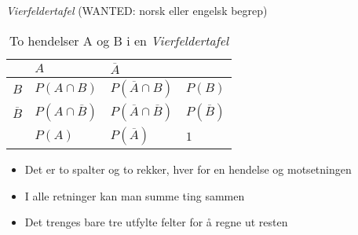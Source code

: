\begin{frame}{\textit{Vierfeldertafel} (WANTED: norsk eller engelsk begrep)}
\begin{table}[h!]
\centering
\label{tab:prob_two_events}
\begin{tabular}{l|ll|l}
\cline{2-3}
                            & $A$            & $\overline{A}$            &                               \\ \hline
\multicolumn{1}{|l|}{$B$}   & $P(A\cap B)$   & $P(\overline{A}\cap B)$   & \multicolumn{1}{l|}{$P(B)$}   \\
\multicolumn{1}{|l|}{$\overline{B}$} & $P(A\cap \overline{B})$ & $P(\overline{A}\cap \overline{B})$ & \multicolumn{1}{l|}{$P(\overline{B})$} \\ \hline
                            & $P(A)$         & $P(\overline{A})$         & \multicolumn{1}{l|}{$1$}      \\ \cline{2-4} 
\end{tabular}
\caption{To hendelser A og B i en \textit{Vierfeldertafel}}
\end{table}
\pause
\begin{itemize}[<+->]
\item Det er to spalter og to rekker, hver for en hendelse og motsetningen
\item I alle retninger kan man summe ting sammen
\item Det trenges bare tre utfylte felter for å regne ut resten
\end{itemize}
\end{frame}

